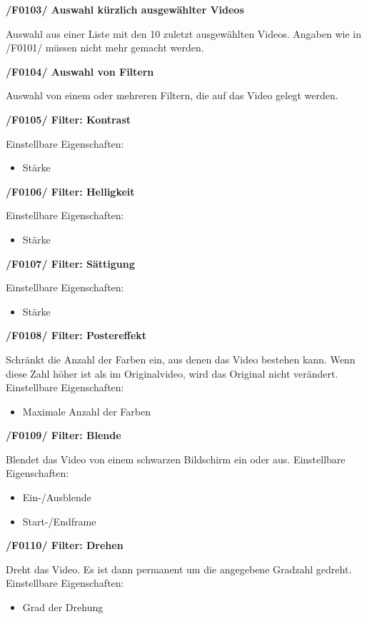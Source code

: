 \documentclass[parskip=full]{scrartcl}
\begin{document}
\textbf{/F0103/ Auswahl kürzlich ausgewählter Videos}

Auswahl aus einer Liste mit den 10 zuletzt ausgewählten Videos. Angaben wie in /F0101/ müssen
nicht mehr gemacht werden.

\textbf{/F0104/ Auswahl von Filtern}

Auswahl von einem oder mehreren Filtern, die auf das Video gelegt werden.

\textbf{/F0105/ Filter: Kontrast}

Einstellbare Eigenschaften:
\begin{itemize}
\item Stärke
\end{itemize}

\textbf{/F0106/ Filter: Helligkeit}

Einstellbare Eigenschaften:
\begin{itemize}
\item Stärke
\end{itemize}
\newpage
\textbf{/F0107/ Filter: Sättigung}

Einstellbare Eigenschaften:
\begin{itemize}
\item Stärke
\end{itemize}
\textbf{/F0108/ Filter: Postereffekt}

Schränkt die Anzahl der Farben ein, aus denen das Video bestehen kann. Wenn diese Zahl höher ist als im Originalvideo, wird das Original nicht verändert.
Einstellbare Eigenschaften:
\begin{itemize}
\item Maximale Anzahl der Farben
\end{itemize}

\textbf{/F0109/ Filter: Blende}

Blendet das Video von einem schwarzen Bildschirm ein oder aus.
Einstellbare Eigenschaften:
\begin{itemize}
\item Ein-/Ausblende
\item Start-/Endframe
\end{itemize}

\textbf{/F0110/ Filter: Drehen}

Dreht das Video. Es ist dann permanent um die angegebene Gradzahl gedreht.
Einstellbare Eigenschaften:
\begin{itemize}
\item Grad der Drehung
\end{itemize}
\end{document}
